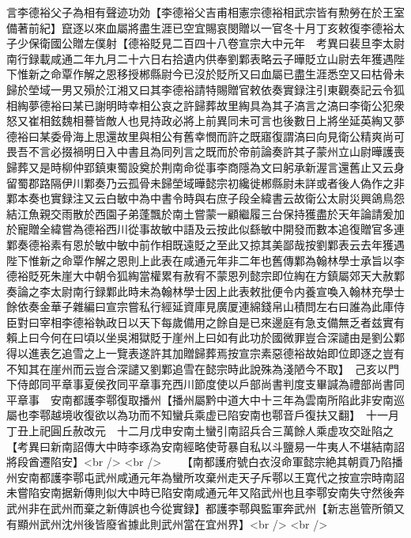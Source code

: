 言李德裕父子為相有聲迹功効【李德裕父吉甫相憲宗德裕相武宗皆有勲勞在於王室備著前紀】竄逐以來血屬將盡生涯已空宜賜哀閔贈以一官冬十月丁亥敕復李德裕太子少保衛國公贈左僕射【德裕貶見二百四十八卷宣宗大中元年　考異曰裴旦李太尉南行録載咸通二年九月二十六日右拾遺内供奉劉鄴表略云子曄貶立山尉去年獲遇陛下惟新之命覃作解之恩移授郴縣尉今已沒於貶所又曰血屬已盡生涯悉空又曰枯骨未歸於塋域一男又殞於江湘又曰其李德裕請特賜贈官敕依奏實録注引東觀奏記云令狐相綯夢德裕曰某已謝明時幸相公哀之許歸葬故里綯具為其子滈言之滈曰李衛公犯衆怒又崔相鉉魏相謩皆敵人也見持政必將上前異同未可言也後數日上將坐延英綯又夢德裕曰某委骨海上思還故里與相公有舊幸憫而許之既寤復謂滈曰向見衛公精爽尚可畏吾不言必掇禍明日入中書且為同列言之既而於帝前論奏許其子蒙州立山尉曄護喪歸葬又是時柳仲郢鎮東蜀設奠於荆南命從事李商隱為文曰躬承新渥言還舊止又云身留蜀郡路隔伊川鄴奏乃云孤骨未歸塋域曄懿宗初纔徙郴縣尉未詳或者後人偽作之非鄴本奏也實録注又云白敏中為中書令時與右庶子段全緯書云故衛公太尉災興鴿鳥怨結江魚親交雨散於西園子弟蓬飄於南土嘗蒙一顧繼履三台保持獲盡於天年論請爰加於寵贈全緯嘗為德裕西川從事故敏中語及云按此似繇敏中開發而數本追復贈官多連鄴奏德裕素有恩於敏中敏中前作相既遠貶之至此又掠其美鄙哉按劉鄴表云去年獲遇陛下惟新之命覃作解之恩則上此表在咸通元年非二年也舊傳鄴為翰林學士承旨以李德裕貶死朱崖大中朝令狐綯當權累有赦宥不蒙恩列懿宗即位綯在方鎮屬郊天大赦鄴奏論之李太尉南行録鄴此時未為翰林學士因上此表敕批便令内養宣喚入翰林充學士餘依奏金華子雜編曰宣宗嘗私行經延資庫見廣厦連綿錢帛山積問左右曰誰為此庫侍臣對曰宰相李德裕執政日以天下每歲備用之餘自是已來邊庭有急支備無乏者兹實有賴上曰今何在曰頃以坐吳湘獄貶于崖州上曰如有此功於國微罪豈合深譴由是劉公鄴得以進表乞追雪之上一覽表遂許其加贈歸葬焉按宣宗素惡德裕故始即位即逐之豈有不知其在崖州而云豈合深譴又劉鄴追雪在懿宗時此說殊為淺陋今不取】　己亥以門下侍郎同平章事夏侯孜同平章事充西川節度使以戶部尚書判度支畢諴為禮部尚書同平章事　安南都護李鄠復取播州【播州屬黔中道大中十三年為雲南所陷此非安南巡屬也李鄠越境收復欲以為功而不知蠻兵乘虚已陷安南也鄠音戶復扶又翻】　十一月丁丑上祀圓丘赦改元　十二月戊申安南土蠻引南詔兵合三萬餘人乘虚攻交趾陷之【考異曰新南詔傳大中時李琢為安南經略使苛暴自私以斗鹽易一牛夷人不堪結南詔將段酋遷陷安】<br />
<br />
　　【南都護府號白衣沒命軍懿宗絶其朝貢乃陷播州安南都護李鄠屯武州咸通元年為蠻所攻棄州走天子斥鄠以王寛代之按宣宗時南詔未嘗陷安南据新傳則似大中時已陷安南咸通元年又陷武州也且李鄠安南失守然後奔武州非在武州而棄之新傳誤也今從實録】都護李鄠與監軍奔武州【新志邕管所領又有顯州武州沈州後皆廢省據此則武州當在宜州界】<br />
<br />
